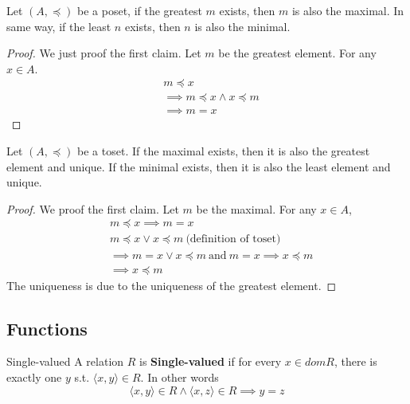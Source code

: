 \begin{proposition}{}{}
    Let $(A,\preceq)$ be a poset, if the greatest $m$ exists, then $m$ is also the maximal. In same way, if the least $n$ exists, then $n$ is also the minimal.
\end{proposition}

\begin{proof}
    We just proof the first claim. Let $m$ be the greatest element.
    For any $x \in A$.
    \begin{align*}
        &m \preceq x\\
        &\implies m \preceq x \land x \preceq m\\
        &\implies m = x
    \end{align*}
\end{proof}

\begin{theorem}{}{}
    Let $(A,\preceq)$ be a toset. If the maximal exists, then it is also the greatest element and unique. 
    If the minimal exists, then it is also the least element and unique.
\end{theorem}

\begin{proof}
    We proof the first claim. Let $m$ be the maximal. For any $x \in A$,
    \begin{align*}
        &m \preceq x \implies m = x\\
        &m \preceq x \lor x \preceq m \ \text{(definition of toset)}\\
        &\implies m = x \lor x \preceq m \ \text{and}\  m = x \implies x \preceq m\\
        &\implies x \preceq m 
    \end{align*}
    The uniqueness is due to the uniqueness of the greatest element.
\end{proof}

\subsection{Functions}

\begin{definition}{Single-valued}{}
    A relation $R$ is \textbf{Single-valued} if for every $x \in dom R$, there is exactly one $y$ s.t. $\langle x,y \rangle \in R$. In other words
    \begin{equation*}
        \langle x,y \rangle \in R \land \langle x,z \rangle \in R \implies y = z
    \end{equation*}
\end{definition}

